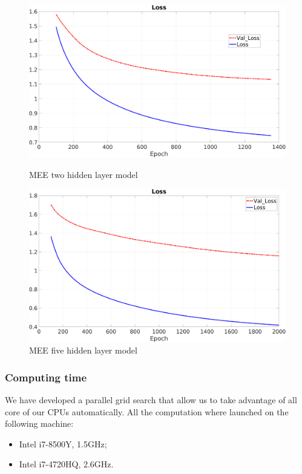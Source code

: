 \begin{figure}[H]
	\centering
	\begin{minipage}[t]{0.5\linewidth}
		\includegraphics[width=\linewidth]{img/Cup_loss_Reg_Zoom_2l.png}
		\caption{MEE two hidden layer model}
		\label{img::twolayer}
	\end{minipage}%
	\begin{minipage}[t]{0.5\linewidth}
		\includegraphics[width=\linewidth]{img/Cup_loss_Reg_Zoom_5l.png}
		\caption{MEE five hidden layer model}
		\label{img::fivelayer}
	\end{minipage}
\end{figure}

\subsubsection{Computing time}
We have developed a parallel grid search that allow us to take advantage of all core of our CPUs automatically. All the computation where launched on the following machine:
\begin{itemize}
	\item Intel i7-8500Y, 1.5GHz;
	\item Intel i7-4720HQ, 2.6GHz.
	
\end{itemize}

